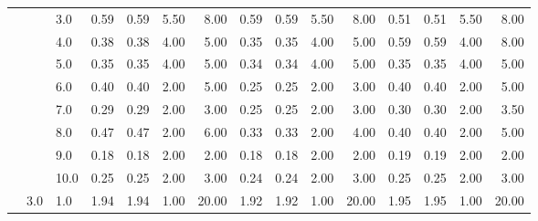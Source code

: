 \begin{tabular}{lllrrrrrrrrrrrr}
       &     & 3.0  &       0.59 &      0.59 & 5.50 &   8.00 &       0.59 &      0.59 & 5.50 &   8.00 &       0.51 &      0.51 & 5.50 &   8.00 \\
       &     & 4.0  &       0.38 &      0.38 & 4.00 &   5.00 &       0.35 &      0.35 & 4.00 &   5.00 &       0.59 &      0.59 & 4.00 &   8.00 \\
       &     & 5.0  &       0.35 &      0.35 & 4.00 &   5.00 &       0.34 &      0.34 & 4.00 &   5.00 &       0.35 &      0.35 & 4.00 &   5.00 \\
       &     & 6.0  &       0.40 &      0.40 & 2.00 &   5.00 &       0.25 &      0.25 & 2.00 &   3.00 &       0.40 &      0.40 & 2.00 &   5.00 \\
       &     & 7.0  &       0.29 &      0.29 & 2.00 &   3.00 &       0.25 &      0.25 & 2.00 &   3.00 &       0.30 &      0.30 & 2.00 &   3.50 \\
       &     & 8.0  &       0.47 &      0.47 & 2.00 &   6.00 &       0.33 &      0.33 & 2.00 &   4.00 &       0.40 &      0.40 & 2.00 &   5.00 \\
       &     & 9.0  &       0.18 &      0.18 & 2.00 &   2.00 &       0.18 &      0.18 & 2.00 &   2.00 &       0.19 &      0.19 & 2.00 &   2.00 \\
       &     & 10.0 &       0.25 &      0.25 & 2.00 &   3.00 &       0.24 &      0.24 & 2.00 &   3.00 &       0.25 &      0.25 & 2.00 &   3.00 \\
       & 3.0 & 1.0  &       1.94 &      1.94 & 1.00 &  20.00 &       1.92 &      1.92 & 1.00 &  20.00 &       1.95 &      1.95 & 1.00 &  20.00 \\
\bottomrule
\end{tabular}
